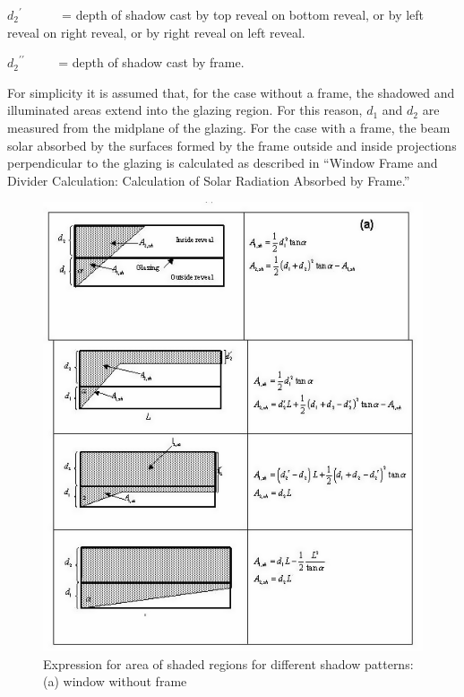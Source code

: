 \({d_2}^\prime\) ~~~~~ = depth of shadow cast by top reveal on bottom reveal, or by left reveal on right reveal, or by right reveal on left reveal.

\({d_2}^{\prime \prime }\) ~~~~ = depth of shadow cast by frame.

For simplicity it is assumed that, for the case without a frame, the shadowed and illuminated areas extend into the glazing region. For this reason, \({d_1}\) and \({d_2}\) are measured from the midplane of the glazing. For the case with a frame, the beam solar absorbed by the surfaces formed by the frame outside and inside projections perpendicular to the glazing is calculated as described in ``Window Frame and Divider Calculation: Calculation of Solar Radiation Absorbed by Frame.''

\begin{figure}[htbp]
\centering
\includegraphics{media/image1605.png}
\caption{Expression for area of shaded regions for different shadow patterns: (a) window without frame}
\label{fig:expression-for-area-of-shaded-regions-part-a}
\end{figure}

